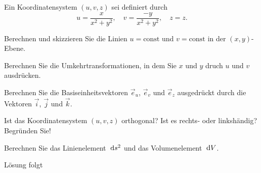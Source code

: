 \documentclass{atistandalonetask}
\begin{document}
  \begin{atiTask}[
    title = Koordinatentransformation
  ]

Ein Koordinatensystem $(u,v,z)$ sei definiert durch
\[
u=\frac{x}{x^2+y^2},\quad v=\frac{-y}{x^2+y^2},\quad z=z.
\]
	\begin{atiSubtasks}
		\item Berechnen und skizzieren Sie die Linien $u=\text{const}$ und $v=\text{const}$ in der $(x,y)$-Ebene.
		\item Berechnen Sie die Umkehrtransformationen, in dem Sie $x$ und $y$ druch $u$ und $v$ ausdrücken.
		\item Berechnen Sie die Basiseinheitsvektoren $\vec{e}_u$, $\vec{e}_v$ und $\vec{e}_z$ ausgedrückt durch die Vektoren $\vec{i}$, $\vec{j}$ und $\vec{k}$.
		\item Ist das Koordinatensystem $(u,v,z)$ orthogonal? Ist es rechts- oder linkshändig? Begründen Sie!
		\item Berechnen Sie das Linienelement $\;\mathrm{d} s^2$ und das Volumenelement $\;\mathrm{d} V$.
	\end{atiSubtasks} 
  \end{atiTask}
  \begin{atiSolution}
  Lösung folgt
  \end{atiSolution}
\end{document}
